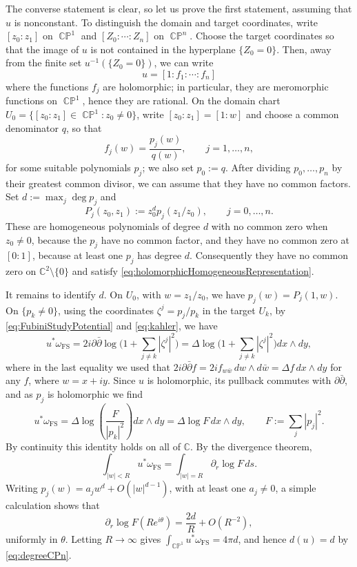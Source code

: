 \documentclass[11pt]{article}
\theoremstyle{plain}
\numberwithin{equation}{section}
\theoremstyle{definition}
\let\oldendproof\endproof
\renewenvironment{proof}[1][\proofname]{%
\oldproof[\upshape \bfseries #1]%
}{\oldendproof}
\def \C{\mathbb{C}}
\def \p{\partial}
\def \FS{\mathrm{FS}}
\DeclareMathOperator{\CP}{\mathbb{CP}}
\begin{document}
\begin{proof}
The converse statement is clear, so let us prove the first statement, assuming 
that $u$ is nonconstant.  To distinguish the domain and target coordinates,
write $[z_0:z_1]$ on $\CP^1$ and $[Z_0:\cdots:Z_n]$ on $\CP^n$.  Choose the
target coordinates so that the image of $u$ is not contained in the
hyperplane $\{Z_0=0\}$.  Then, away from the finite set $u^{-1}(\{Z_0=0\})$, we can write
\[
    u=[1:f_1:\cdots:f_n]
\]
where the functions $f_j$ are holomorphic; in particular, they are
meromorphic functions on $\CP^1$, hence they are rational.  On the domain
chart
$U_0=\{[z_0:z_1]\in\CP^1:z_0\neq0\}$, write $[z_0:z_1]=[1:w]$ and
choose a common denominator $q$, so that
\[
    f_j(w)=\frac{p_j(w)}{q(w)},
    \qquad j=1,\ldots,n,
\]
for some suitable polynomials $p_j$; we also set $p_0:=q$. After dividing $p_0,\ldots,p_n$ by their greatest common divisor, we can assume that they have no common factors.  
Set $d:=\max_j\deg p_j$ and
\[
    P_j(z_0,z_1):=z_0^d p_j(z_1/z_0),
    \qquad j=0,\ldots,n.
\]
These are homogeneous polynomials of degree $d$ with no common zero
when $z_0\neq0$, because the $p_j$ have no common factor, and they have no
common zero at $[0:1]$, because at least one $p_j$ has degree $d$.
Consequently they have no common zero on $\C^2\setminus\{0\}$ and satisfy
\eqref{eq:holomorphicHomogeneousRepresentation}.

It remains to identify $d$.  On $U_0$, with
$w=z_1/z_0$, we have $p_j(w)=P_j(1,w)$. On $\{p_k\neq0\}$, using the coordinates $\zeta^j=p_j/p_k$ in the target $U_k$,  by \eqref{eq:FubiniStudyPotential}  and \eqref{eq:kahler},  we have
$$u^*\omega_\FS = 2 i \p \bar \p \log \bigg(1+\sum_{j\neq k} |\zeta^j|^2\bigg)= \Delta \log \bigg(1+\sum_{j\neq k} |\zeta^j|^2\bigg) d x \wedge d y,$$ 
where in the last equality we used that
$2i \p \bar \p f =2i  f_{w \bar w} \,d w \wedge d \bar w = \Delta f \, d x \wedge d y$ for any $f$, where $w=x+i y$.
Since $u$ is holomorphic, its pullback commutes with $\p \bar \p$, and as $p_j$ is holomorphic we find
\[
    u^*\omega_\FS
    =\Delta 
      \log\left(\frac{F}{|p_k|^2}\right) d x \wedge d y
    =\Delta \log F \, d x \wedge d y, \qquad F:=\sum_j|p_j|^2.
\]
By continuity this identity holds on all of $\C$.  By the divergence theorem,
\[
    \int_{|w|<R}u^*\omega_\FS
    =\int_{|w|=R}\partial_r\log F\,ds.
\]
Writing $p_j(w)=a_jw^d+O(|w|^{d-1})$, with at least one $a_j\neq0$, a simple calculation shows that 
\[
    \partial_r\log F(Re^{i\theta})
    =\frac{2d}{R}+O(R^{-2}),
\]
uniformly in $\theta$.
Letting $R\to\infty$ gives
$\int_{\CP^1}u^*\omega_\FS=4\pi d$, and hence $d(u)=d$ by
\eqref{eq:degreeCPn}.
\end{proof}
\end{document}
